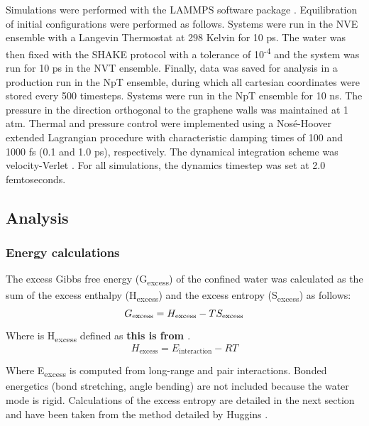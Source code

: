 \documentclass[12pt]{article}
\begin{document}
Simulations were performed with the LAMMPS software package \cite{Plimpton1995}. 
Equilibration of initial configurations were performed as follows. Systems were run in 
the NVE ensemble with a Langevin Thermostat at 298 Kelvin
for 10 ps. The water was then fixed with the SHAKE protocol \cite{Andersen1983} with a tolerance
of 10\textsuperscript{-4} and the system was run for 10 ps in the NVT ensemble.
Finally, data was saved for analysis in a production run in the NpT ensemble,
during which all cartesian coordinates were stored every 500 timesteps. 
Systems were run in the NpT ensemble for 10 ns. The 
pressure in the direction orthogonal to the graphene walls was maintained at 1 atm.
Thermal and pressure control were implemented using a Nos\' e-Hoover 
extended Lagrangian procedure \cite{Martyna1994} with characteristic damping times of 100 
and 1000 fs (0.1 and 1.0 ps), respectively. The dynamical integration 
scheme was velocity-Verlet \cite{Swope1982}.
For all simulations, the dynamics timestep was set at 2.0 femtoseconds. 

\subsection*{Analysis}

\subsubsection*{Energy calculations}

The excess Gibbs free energy (G\textsubscript{excess}) of the confined water was calculated as the sum of the excess enthalpy (H\textsubscript{excess}) and the excess entropy (S\textsubscript{excess}) as follows:
\begin{equation}
    G\textsubscript{excess}  =  H_{\text{excess}} - T  S_{\text{excess}}
\end{equation}

Where is H\textsubscript{excess} defined as \textbf{\color{red}this is from \cite{Huggins2012}}. 
\begin{equation}
    H_{\text{excess}} = E_{\text{interaction}} - RT
\end{equation}

Where E\textsubscript{excess} is computed from long-range and pair interactions. Bonded energetics (bond stretching, angle bending) are not included because the water mode is rigid. Calculations of the excess entropy are detailed in the next section and have been taken from the method detailed by Huggins \cite{Huggins2012}.
\end{document}
